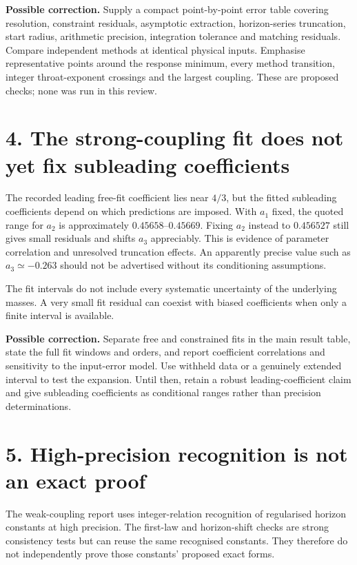 \documentclass[11pt,a4paper]{article}
\begin{document}
\textbf{Possible correction.} Supply a compact point-by-point error table covering resolution, constraint residuals, asymptotic extraction, horizon-series truncation, start radius, arithmetic precision, integration tolerance and matching residuals. Compare independent methods at identical physical inputs. Emphasise representative points around the response minimum, every method transition, integer throat-exponent crossings and the largest coupling. These are proposed checks; none was run in this review.

\section*{4. The strong-coupling fit does not yet fix subleading coefficients}
The recorded leading free-fit coefficient lies near $4/3$, but the fitted subleading coefficients depend on which predictions are imposed. With $a_1$ fixed, the quoted range for $a_2$ is approximately $0.45658$--$0.45669$. Fixing $a_2$ instead to $0.456527$ still gives small residuals and shifts $a_3$ appreciably. This is evidence of parameter correlation and unresolved truncation effects. An apparently precise value such as $a_3\simeq-0.263$ should not be advertised without its conditioning assumptions.

The fit intervals do not include every systematic uncertainty of the underlying masses. A very small fit residual can coexist with biased coefficients when only a finite interval is available.

\textbf{Possible correction.} Separate free and constrained fits in the main result table, state the full fit windows and orders, and report coefficient correlations and sensitivity to the input-error model. Use withheld data or a genuinely extended interval to test the expansion. Until then, retain a robust leading-coefficient claim and give subleading coefficients as conditional ranges rather than precision determinations.

\section*{5. High-precision recognition is not an exact proof}
The weak-coupling report uses integer-relation recognition of regularised horizon constants at high precision. The first-law and horizon-shift checks are strong consistency tests but can reuse the same recognised constants. They therefore do not independently prove those constants' proposed exact forms.
\end{document}
